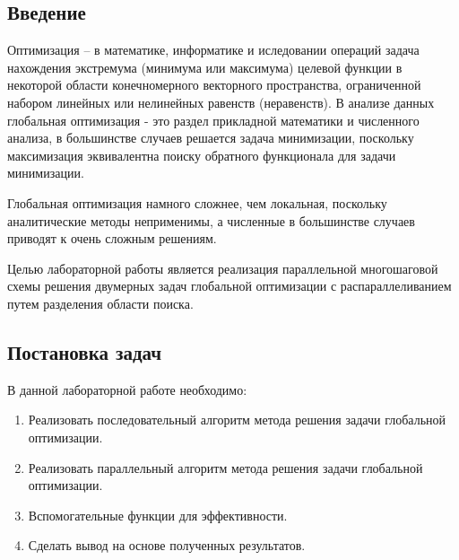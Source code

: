 \documentclass[a4paper]{report}
\begin{document}
\begin{center}
\section*{Введение}
\end{center}
\par Оптимизация -- в математике, информатике и иследовании операций задача нахождения экстремума (минимума или максимума) целевой функции в некоторой области конечномерного векторного пространства, ограниченной набором линейных или нелинейных равенств (неравенств). В анализе данных глобальная оптимизация - это раздел прикладной математики и численного анализа, в большинстве случаев решается задача минимизации, поскольку максимизация эквивалентна поиску обратного функционала для задачи минимизации.
\par Глобальная оптимизация намного сложнее, чем локальная, поскольку аналитические методы неприменимы, а численные в большинстве случаев приводят к очень сложным решениям.
\par Целью лабораторной работы является реализация параллельной многошаговой схемы решения двумерных задач глобальной оптимизации с распараллеливанием путем разделения области поиска. 
\newpage

\begin{center}
\section*{Постановка задач}
\end{center}
В данной лабораторной работе необходимо:
\begin{enumerate}
\item Реализовать последовательный алгоритм метода решения задачи глобальной оптимизации.
\item Реализовать параллельный алгоритм метода решения задачи глобальной оптимизации.
\item Вспомогательные функции для эффективности.
\item Сделать вывод на основе полученных результатов.
\end{enumerate}
\newpage
\end{document}
